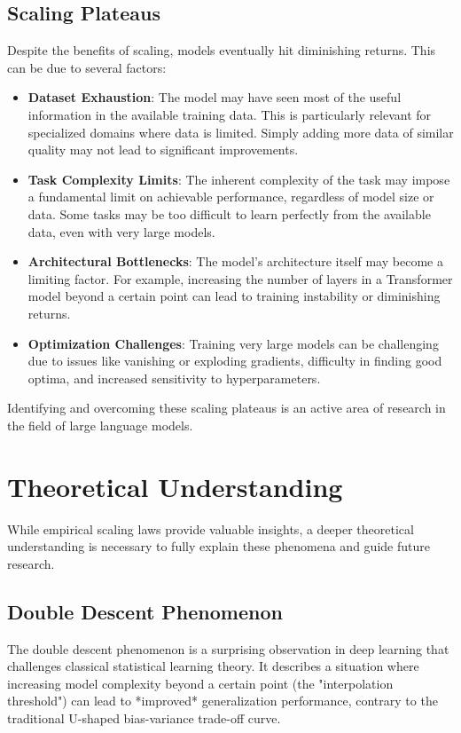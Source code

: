 \subsection{Scaling Plateaus}
\noindent
Despite the benefits of scaling, models eventually hit diminishing returns. This can be due to several factors:

\begin{itemize}[noitemsep]
    \item \textbf{Dataset Exhaustion}:  The model may have seen most of the useful information in the available training data. This is particularly relevant for specialized domains where data is limited. Simply adding more data of similar quality may not lead to significant improvements.
    \item \textbf{Task Complexity Limits}:  The inherent complexity of the task may impose a fundamental limit on achievable performance, regardless of model size or data. Some tasks may be too difficult to learn perfectly from the available data, even with very large models.
    \item \textbf{Architectural Bottlenecks}:  The model's architecture itself may become a limiting factor. For example, increasing the number of layers in a Transformer model beyond a certain point can lead to training instability or diminishing returns.
    \item \textbf{Optimization Challenges}: Training very large models can be challenging due to issues like vanishing or exploding gradients, difficulty in finding good optima, and increased sensitivity to hyperparameters.
\end{itemize}

Identifying and overcoming these scaling plateaus is an active area of research in the field of large language models.

\section{Theoretical Understanding}
\label{sec:theoretical_understanding}

While empirical scaling laws provide valuable insights, a deeper theoretical understanding is necessary to fully explain these phenomena and guide future research.

\subsection{Double Descent Phenomenon}
\noindent
The double descent phenomenon is a surprising observation in deep learning that challenges classical statistical learning theory. It describes a situation where increasing model complexity beyond a certain point (the "interpolation threshold") can lead to *improved* generalization performance, contrary to the traditional U-shaped bias-variance trade-off curve.

